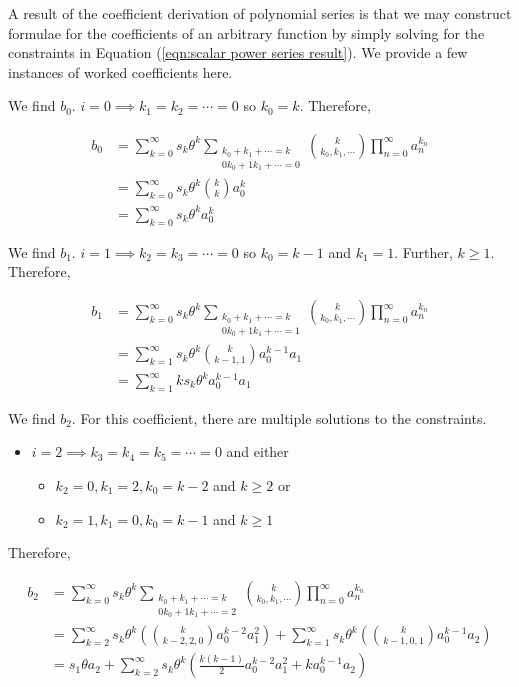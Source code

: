 A result of the coefficient derivation of polynomial series is that we may construct formulae for the coefficients of an arbitrary function by simply solving for the constraints in Equation (\ref{eqn:scalar power series result}). We provide a few instances of worked coefficients here. 

We find $b_0$. $i = 0 \implies k_1 = k_2 = \cdots = 0$ so $k_0 = k$. Therefore,

\begin{align}
    b_0 
    &= \sum_{k=0}^{\infty} s_k \theta^k \sum_{\substack{k_0 + k_1 + \cdots = k \\ 0 k_0 + 1 k_1 + \cdots = 0}} \binom{k}{k_0, k_1, \cdots} \prod_{n=0}^{\infty} a_n^{k_n} \nonumber \\
    &= \sum_{k=0}^{\infty} s_k \theta^k \binom{k}{k} a_0^{k} \nonumber \\
    &= \sum_{k=0}^{\infty} s_k \theta^k a_0^k
\end{align}

We find $b_1$. $i = 1 \implies k_2 = k_3 = \cdots = 0$ so $k_0 = k - 1$ and $k_1 = 1$. Further, $k \geq 1$. Therefore,

\begin{align}
    b_1
    &= \sum_{k=0}^{\infty} s_k \theta^k \sum_{\substack{k_0 + k_1 + \cdots = k \\ 0 k_0 + 1 k_1 + \cdots = 1}} \binom{k}{k_0, k_1, \cdots} \prod_{n=0}^{\infty} a_n^{k_n} \nonumber \\
    &= \sum_{k=1}^{\infty} s_k \theta^k \binom{k}{k - 1, 1} a_0^{k - 1} a_1 \nonumber \\
    &= \sum_{k=1}^{\infty} k s_k \theta^k a_0^{k-1} a_1
\end{align}

We find $b_2$. For this coefficient, there are multiple solutions to the constraints. 

\begin{itemize}
    \item $i = 2 \implies k_3 = k_4 = k_5 = \cdots = 0$ and either
    \begin{itemize}
        \item $k_2 = 0, k_1 = 2, k_0 = k - 2$ and $k \geq 2$ or
        \item $k_2 = 1, k_1 = 0, k_0 = k - 1$ and $k \geq 1$
    \end{itemize}
\end{itemize}

Therefore,

\begin{align}
    b_2
    &= \sum_{k=0}^{\infty} s_k \theta^k \sum_{\substack{k_0 + k_1 + \cdots = k \\ 0 k_0 + 1 k_1 + \cdots = 2}} \binom{k}{k_0, k_1, \cdots} \prod_{n=0}^{\infty} a_n^{k_n} \nonumber \\
    &= \sum_{k=2}^{\infty} s_k \theta^k \left(\binom{k}{k - 2, 2, 0}a_0^{k-2} a_1^{2}\right) + \sum_{k=1}^{\infty} s_k \theta^k \left(\binom{k}{k - 1, 0, 1}a_0^{k-1} a_2\right) \nonumber \\
    &= s_1 \theta a_2 + \sum_{k=2}^{\infty} s_k \theta^k \left(\frac{k(k-1)}{2} a_0^{k-2}a_1^{2} + k a_0^{k-1}a_2\right)
\end{align}
